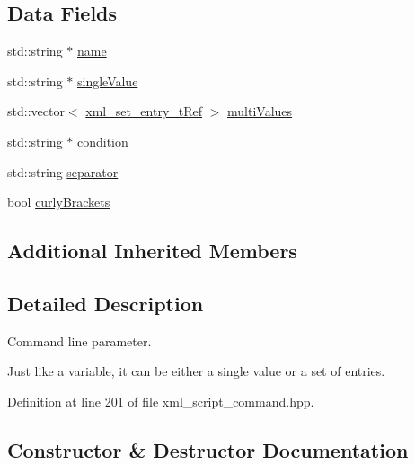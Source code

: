 \subsection*{Data Fields}
\begin{DoxyCompactItemize}
\item 
std\+::string $\ast$ \hyperlink{classxml__parameter__t_afaf6a5a5447fa90ac73e20ed482e695f}{name}
\item 
std\+::string $\ast$ \hyperlink{classxml__parameter__t_a361a307b22517fbb5f7e515dd2e01b91}{single\+Value}
\item 
std\+::vector$<$ \hyperlink{xml__script__command_8hpp_aeb61f959795afd2b743d3bec00ee66fa}{xml\+\_\+set\+\_\+entry\+\_\+t\+Ref} $>$ \hyperlink{classxml__parameter__t_af2f23340fda44cd3d84528d581a8d80d}{multi\+Values}
\item 
std\+::string $\ast$ \hyperlink{classxml__parameter__t_a41d9d36d2bdb280c9e828e34da158b53}{condition}
\item 
std\+::string \hyperlink{classxml__parameter__t_afa8e2f2feafccd502a29ba8ce48658a5}{separator}
\item 
bool \hyperlink{classxml__parameter__t_a71489b0ad28ba0740a7c968a8f4e3684}{curly\+Brackets}
\end{DoxyCompactItemize}
\subsection*{Additional Inherited Members}


\subsection{Detailed Description}
Command line parameter. 

Just like a variable, it can be either a single value or a set of entries. 

Definition at line 201 of file xml\+\_\+script\+\_\+command.\+hpp.



\subsection{Constructor \& Destructor Documentation}
\mbox{\label{classxml__parameter__t_a7caffd6264abca12e89ee53de27202e7}} 
